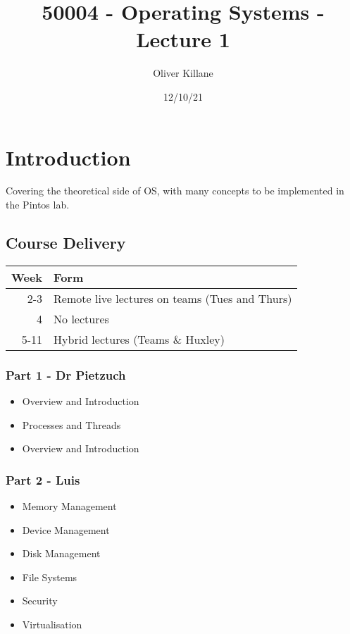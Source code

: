 \documentclass{report}
\title{50004 - Operating Systems - Lecture 1}
\author{Oliver Killane}
\date{12/10/21}
\begin{document}
    \maketitle
    \section*{Introduction}
        Covering the theoretical side of OS, with many concepts to be implemented in the Pintos lab.
        \subsection*{Course Delivery}
            \begin{center}
                \begin{tabular}{r l}
                    Week & Form \\
                    \hline
                    2-3 & Remote live lectures on teams (Tues and Thurs) \\
                    4 & No lectures \\
                    5-11 & Hybrid lectures (Teams \& Huxley) \\
                \end{tabular}
            \end{center}
            \subsubsection*{Part 1 - Dr Pietzuch}
                \begin{itemize}
                    \item Overview and Introduction
                    \item Processes and Threads
                    \item Overview and Introduction
                \end{itemize}
                \subsubsection*{Part 2 - Luis}
                \begin{itemize}
                    \item Memory Management
                    \item Device Management
                    \item Disk Management
                    \item File Systems
                    \item Security
                    \item Virtualisation
                \end{itemize}
\end{document}
